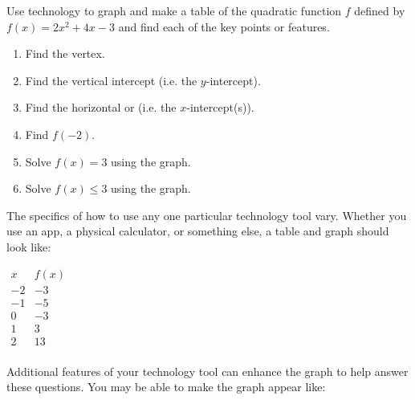 \documentclass{ximera}
\begin{document}
 \begin{example}
          Use technology to graph and make a table of the quadratic function $f$ defined by
          $f(x)=2x^2+4x-3$ and find each of the key points or features.
\begin{enumerate}
                \item Find the vertex.
                \item Find the vertical intercept  (i.e. the $y$-intercept).
                       \item Find the horizontal or (i.e. the $x$-intercept(s)).
               \item  Find $f(-2)$.
      \item Solve $f(x)=3$ using the graph.
           \item Solve $f(x)\le 3$ using the graph.
        \end{enumerate}
\begin{explanation}
           The specifics of how to use any one particular technology tool vary.
            Whether you use an app, a physical calculator,
            or something else, a table and graph should look like:\\
\begin{center}
          $\begin{array}{cc}
x & f(x) \\
\hline
-2 & -3 \\
-1 & -5 \\
 0 & -3 \\
 1 &  3 \\
 2 & 13 \\
 \end{array}$
\end{center}
\begin{image}
\end{image}
            Additional features of your technology tool can enhance the graph to help answer these questions.
            You may be able to make the graph appear like:
\begin{image}
\end{image}
\end{explanation}
\end{example}
\end{document}
